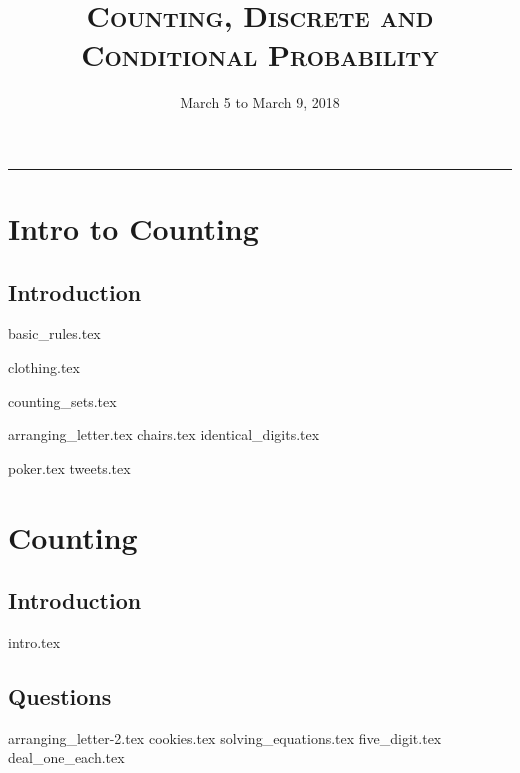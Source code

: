 \documentclass{exam}
\title{\textsc{Counting, Discrete and Conditional Probability}}
\date{March 5 to March 9, 2018}
\begin{document}
\maketitle
\rule{\textwidth}{0.15em}
\fontsize{12}{15}\selectfont
\thispagestyle{empty}


\section{Intro to Counting}
\subsection{Introduction}
{basic_rules.tex}
\begin{questions}
{clothing.tex}
\end{questions}

\newpage

{counting_sets.tex}
\begin{questions}
{arranging_letter.tex}
{chairs.tex}
{identical_digits.tex} 

\newpage

{poker.tex}
{tweets.tex}

\end{questions}

\section{Counting}
\subsection{Introduction}
{intro.tex}
\subsection{Questions}
\begin{questions}
{arranging_letter-2.tex}
{cookies.tex}
{solving_equations.tex}
{five_digit.tex}
{deal_one_each.tex}
\end{questions}
\end{document}
